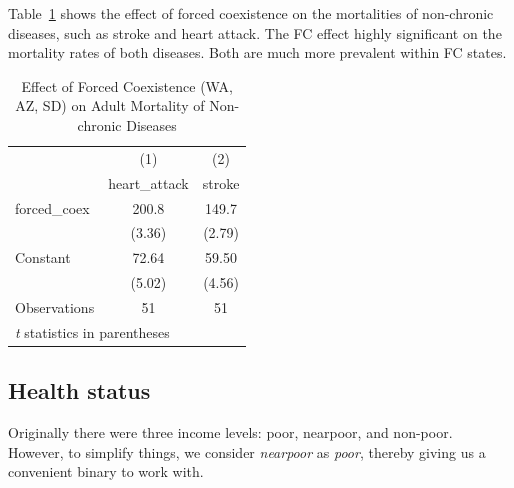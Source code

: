 \documentclass[12pt]{article}
\begin{document}
Table~\ref{fc2} shows the effect of forced coexistence on the mortalities of non-chronic diseases, such as stroke and heart attack. The FC effect highly significant on the mortality rates of both diseases.  Both are much more prevalent within FC states.


\begin{table}[htbp]\centering \caption{Effect of Forced Coexistence (WA, AZ, SD) on Adult Mortality of Non-chronic Diseases\label{fc2}} \begin{tabular}{l*{2}{c}} \toprule
                    &\multicolumn{1}{c}{(1)}&\multicolumn{1}{c}{(2)}\\
                    &\multicolumn{1}{c}{heart\_attack}&\multicolumn{1}{c}{stroke}\\
\midrule
forced\_coex         &       200.8&       149.7\\
                    &      (3.36)&      (2.79)\\
\addlinespace
Constant            &       72.64&       59.50\\
                    &      (5.02)&      (4.56)\\
\midrule
Observations        &          51&          51\\
\bottomrule
\multicolumn{3}{l}{\footnotesize \textit{t} statistics in parentheses}\\
\end{tabular}
\end{table}






\subsection{Health status}
Originally there were three income levels: poor, nearpoor, and non-poor.
However, to simplify things, we consider \emph{nearpoor} as \emph{poor}, thereby giving us a convenient binary to work with.
\end{document}
